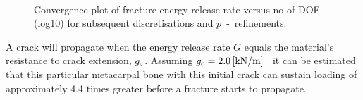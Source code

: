 \documentclass[onecolumn]{svjour3}
\begin{document}
% 	
% 
% 
% 
% 
\begin{figure}[h]
	\centering
	\begin{minipage}{.45\textwidth}
		\def\svgwidth{6.5cm}
		
	\label{fig:bone_ct_mesh_cut}
	\end{minipage}%
	\hspace{0.5cm}
	\begin{minipage}{.45\textwidth}
		\def\svgwidth{6.5cm}
		
		\label{fig:crackfrontforce}
	\end{minipage} \\
	\end{figure}
% 
% 
\begin{figure}[h!]
	\centering
	
	\caption{Convergence plot of fracture energy release rate versus no of DOF (log10) for subsequent discretisations and $p$~-~refinements.}
	\label{fig:max_g1_convergece}
\end{figure}
A crack will propagate when the energy release rate $G$ equals the material's resistance to crack extension, $g_{\rm c}$. Assuming $g_{\rm c} = 2.0\,[\mathrm{ kN/m}]$~\cite{gasser2007numerical} it can be estimated that this particular metacarpal bone with this initial crack can sustain loading of approximately 4.4 times greater before a fracture starts to propagate. 
% 
% 
% 
\end{document}
